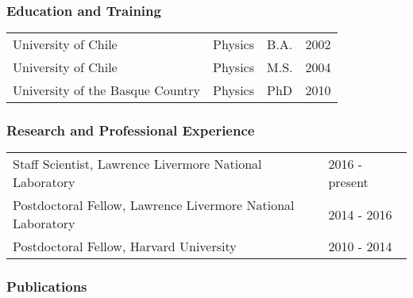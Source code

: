 \subsubsection*{Education and Training}

\begin{table}[ht]
    \centering
    \begin{tabular}{llll}
        University of Chile & Physics & B.A. & 2002  \\
        University of Chile & Physics & M.S. & 2004 \\
        University of the Basque Country & Physics & PhD & 2010\\
    \end{tabular}
\end{table}

\subsubsection*{Research and Professional Experience}

\begin{table}[ht]
    \centering
    \begin{tabular}{ll}
Staff Scientist, Lawrence Livermore National Laboratory &       2016 - present   \\
Postdoctoral Fellow, Lawrence Livermore National Laboratory     &  2014 - 2016   \\
Postdoctoral Fellow, Harvard University &       2010 - 2014 \\
    \end{tabular}
\end{table}

\subsubsection*{Publications}

